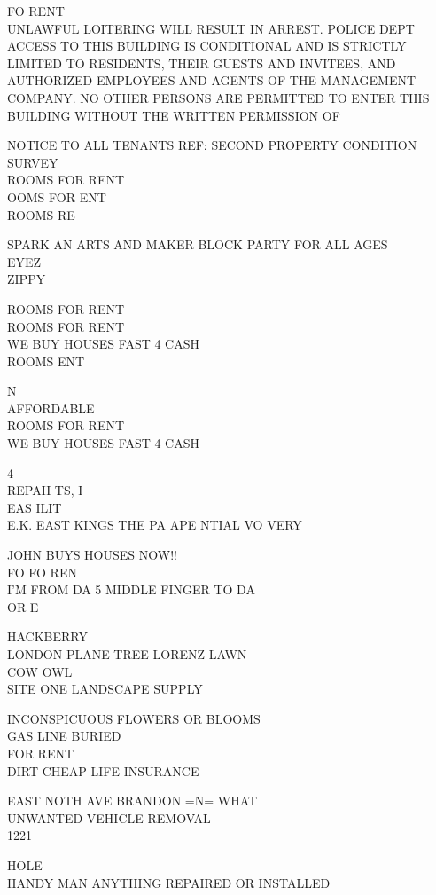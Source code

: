 \documentclass[10pt,letterpaper]{article}
\begin{document}
FO RENT\\
UNLAWFUL LOITERING WILL RESULT IN ARREST.  POLICE DEPT\\
ACCESS TO THIS BUILDING IS CONDITIONAL AND IS STRICTLY LIMITED TO RESIDENTS, THEIR GUESTS AND INVITEES, AND AUTHORIZED EMPLOYEES AND AGENTS OF THE MANAGEMENT COMPANY.  NO OTHER PERSONS ARE PERMITTED TO ENTER THIS BUILDING WITHOUT THE WRITTEN PERMISSION OF

NOTICE TO ALL TENANTS REF: SECOND PROPERTY CONDITION SURVEY\\
ROOMS FOR RENT\\
OOMS FOR ENT\\
ROOMS RE

SPARK AN ARTS AND MAKER BLOCK PARTY FOR ALL AGES\\
EYEZ\\
ZIPPY

ROOMS FOR RENT\\
ROOMS FOR RENT\\
WE BUY HOUSES FAST 4 CASH\\
ROOMS ENT

N\\
AFFORDABLE\\
ROOMS FOR RENT\\
WE BUY HOUSES FAST 4 CASH

4\\
REPAII TS, I\\
EAS ILIT\\
E.K. EAST KINGS THE PA APE NTIAL VO VERY

JOHN BUYS HOUSES NOW!!\\
FO FO REN\\
I'M FROM DA 5 MIDDLE FINGER TO DA\\
OR E

HACKBERRY\\
LONDON PLANE TREE LORENZ LAWN\\
COW OWL\\
SITE ONE LANDSCAPE SUPPLY

INCONSPICUOUS FLOWERS OR BLOOMS\\
GAS LINE BURIED\\
FOR RENT\\
DIRT CHEAP LIFE INSURANCE

EAST NOTH AVE BRANDON =N= WHAT\\
UNWANTED VEHICLE REMOVAL\\
1221

HOLE\\
HANDY MAN ANYTHING REPAIRED OR INSTALLED
\end{document}
